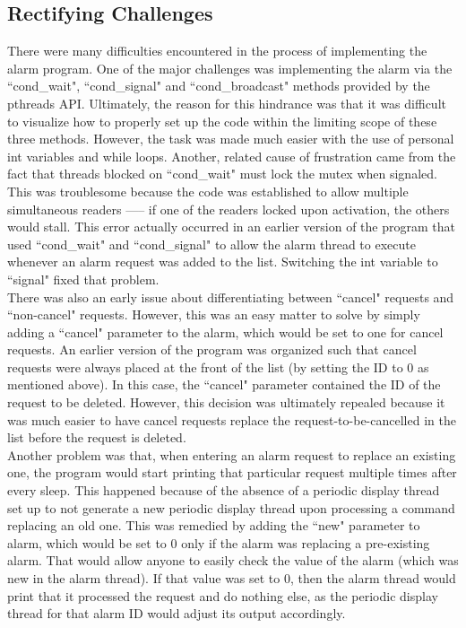 \documentclass[11pt]{article}
\newcommand{\forceindent}{\leavevmode{\parindent=1em\indent}}
\begin{document}
\subsection{Rectifying Challenges}

\forceindent There were many difficulties encountered in the process of implementing the alarm program. One of the major challenges was implementing the alarm via the ``cond\_wait", ``cond\_signal" and ``cond\_broadcast" methods provided by the pthreads API. Ultimately, the reason for this hindrance was that it was difficult to visualize how to properly set up the code within the limiting scope of these three methods. However, the task was made much easier with the use of personal int variables and while loops. Another, related cause of frustration came from the fact that threads blocked on ``cond\_wait" must lock the mutex when signaled. This was troublesome because the code was established to allow multiple simultaneous readers —-- if one of the readers locked upon activation, the others would stall. This error actually occurred in an earlier version of the program that used ``cond\_wait" and ``cond\_signal" to allow the alarm thread to execute whenever an alarm request was added to the list. Switching the int variable to ``signal" fixed that problem.\\

	There was also an early issue about differentiating between ``cancel" requests and ``non-cancel" requests. However, this was an easy matter to solve by simply adding a ``cancel" parameter to the alarm, which would be set to one for cancel requests. An earlier version of the program was organized such that cancel requests were always placed at the front of the list (by setting the ID to 0 as mentioned above). In this case, the ``cancel" parameter contained the ID of the request to be deleted. However, this decision was ultimately repealed because it was much easier to have cancel requests replace the request-to-be-cancelled in the list before the request is deleted. \\
	
	Another problem was that, when entering an alarm request to replace an existing one, the program would start printing that particular request multiple times after every sleep. This happened because of the absence of a periodic display thread set up to not generate a new periodic display thread upon processing a command replacing an old one. This was remedied by adding the ``new" parameter to alarm, which would be set to 0 only if the alarm was replacing a pre-existing alarm. That would allow anyone to easily check the value of the alarm (which was new in the alarm thread). If that value was set to 0, then the alarm thread would print that it processed the request and do nothing else, as the periodic display thread for that alarm ID would adjust its output accordingly. \\
\end{document}
